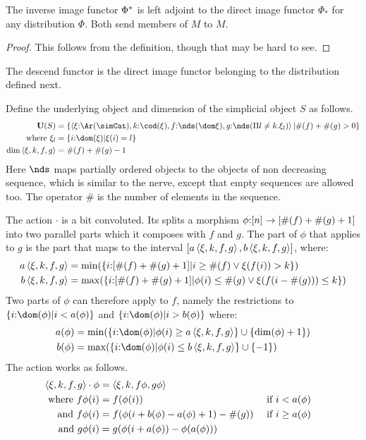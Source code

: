 \documentclass[csh.tex]{subfiles}
\begin{document}
\begin{lemma}
The inverse image functor $\Phi^*$ is left adjoint to the direct image functor $\Phi_*$ for any distribution $\Phi$. Both send members of $M$ to $M$.
\end{lemma}

\begin{proof} This follows from the definition, though that may be hard to see.
\end{proof}

The descend functor is the direct image functor belonging to the distribution defined next.

\newcommand\dset{\mathord\downarrow}
\begin{definition}
Define the underlying object and dimension of the simplicial object $S$ as follows.
\begin{align*}
\base(S) &= \set{\tuplet{\xi\of\Ar(\simCat),k\of\cod(\xi),f\of\nds(\dom
\xi),g\of \nds(\product{l\neq k} \xi_l)}|
\#(f)+\#(g)>0 }\\
\textrm{where }\xi_l &= \set{i\of\dom(\xi)|\xi(i) = l}\\
\dim\tuplet{\xi,k,f,g} &= \#(f) + \#(g) - 1
\end{align*}
Here $\nds$ maps partially ordered objects to the objects of non decreasing sequence, which is similar to the nerve, except that empty sequences are allowed too. The operator $\#$ is the number of elements in the sequence.

The action $\cdot$ is a bit convoluted. Its splits a morphism $\phi\mathord :[n]\to[\#(f)+\#(g)+1]$ into two parallel parts which it composes with $f$ and $g$. The part of $\phi$ that applies to $g$ is the part that maps to the interval $[a\left\langle \xi,k,f,g \right\rangle, b\left\langle \xi,k,f,g \right\rangle]$, where:
\begin{align*}
a\left\langle \xi,k,f,g \right\rangle &= \min(\left\{ i\mathord :[\#(f)+\#(g)+1] | i\geq\#(f) \vee \xi(f(i)) > k \right\})\\
b\left\langle \xi,k,f,g \right\rangle &= \max(\left\{ i\mathord :[\#(f)+\#(g)+1] | \phi(i)\leq\#(g) \vee \xi(f(i - \#(g))) \leq k \right\})
\end{align*}
Two parts of $\phi$ can therefore apply to $f$, namely the restrictions to $\set{i\of\dom(\phi)|i<a(\phi)}$ and $\set{i\of\dom(\phi)|i>b(\phi)}$
where: 
\begin{align*}
a(\phi) &= \min(\set{ i\of\dom(\phi) | \phi(i)\geq a\tuplet{\xi,k,f,g} }\cup\set{\dim(\phi)+1})\\
b(\phi) &= \max(\set{ i\of\dom(\phi) | \phi(i)\leq b\tuplet{\xi,k,f,g} }\cup\set{-1})
\end{align*}
The action works as follows.
\begin{align*}
\left\langle \xi,k,f,g \right\rangle\cdot\phi &= \left\langle \xi,k,f\phi,g\phi \right\rangle\\
\textrm{where }f\phi(i) &= f(\phi(i))&\textrm{ if }& i < a(\phi)\\
\textrm{and }f\phi(i) &= f(\phi(i + b(\phi) - a(\phi) + 1) - \#(g))&\textrm{ if }& i \geq a(\phi)\\
\textrm{and }g\phi(i) &= g(\phi(i + a(\phi)) - \phi(a(\phi)))
\end{align*}


\end{definition}
\end{document}
